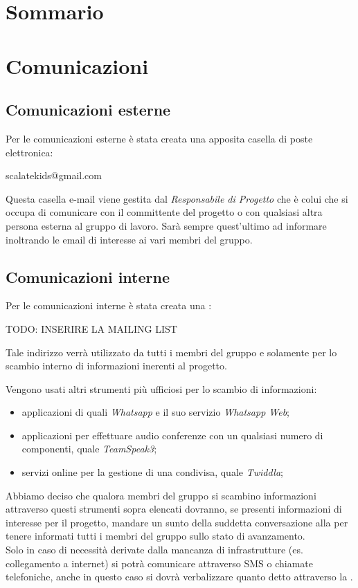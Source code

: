 \documentclass{scalatekids-article}
\begin{document}
\section{Sommario}

\section{Comunicazioni}
\subsection{Comunicazioni esterne}
Per le comunicazioni esterne è stata creata una apposita casella di poste elettronica:
\begin{center}
scalatekids@gmail.com
\end{center}
Questa casella e-mail viene gestita dal \textit{Responsabile di Progetto} che è colui che si occupa di comunicare con il committente del progetto o con qualsiasi altra persona esterna al gruppo di lavoro. Sarà sempre quest'ultimo ad informare inoltrando le email di interesse ai vari membri del gruppo.

\subsection{Comunicazioni interne}
Per le comunicazioni interne è stata creata una :
\begin{center}
TODO: INSERIRE LA MAILING LIST
\end{center}
Tale indirizzo verrà utilizzato da tutti i membri del gruppo e solamente per lo scambio interno di informazioni inerenti al progetto.

Vengono usati altri strumenti più ufficiosi per lo scambio di informazioni:
\begin{itemize}
\item applicazioni di  quali \textit{Whatsapp} e il suo servizio \textit{Whatsapp Web};
\item applicazioni  per effettuare audio conferenze con un qualsiasi numero di componenti, quale \textit{TeamSpeak3};
\item servizi online per la gestione di una  condivisa, quale \textit{Twiddla};
\end{itemize}

Abbiamo deciso che qualora membri del gruppo si scambino informazioni attraverso questi strumenti sopra elencati dovranno, se presenti informazioni di interesse per il progetto, mandare un sunto della suddetta conversazione alla  per tenere informati tutti i membri del gruppo sullo stato di avanzamento.\\
Solo in caso di necessità derivate dalla mancanza di infrastrutture (es. collegamento a internet) si potrà comunicare attraverso SMS o chiamate telefoniche, anche in questo caso si dovrà verbalizzare quanto detto attraverso la .
\end{document}

